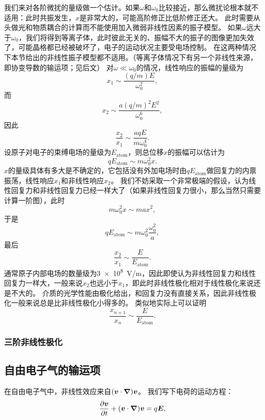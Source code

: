 我们来对各阶微扰的量级做一个估计。如果$\omega$和$\omega_0$比较接近，那么微扰论根本就不适用：此时共振发生，$x$是非常大的，可能高阶修正比低阶修正还大。
此时需要从头做光和物质耦合的计算而不能使用加入微弱非线性因素的振子模型。
如果$\omega$远大于$\omega_0$，我们将得到等离子体，此时彼此无关的、振幅不大的振子的图像更加失效了，可能晶格都已经被破坏了，电子的运动状况主要受电场控制。
在这两种情况下本节给出的非线性振子模型都不适用。（等离子体情况下有另一个非线性来源，即协变导数的输运项；见后文）
对$\omega \ll \omega_0$的情况，线性响应的振幅的量级为
\[
    x_1 \sim \frac{(q/m) E}{\omega_0^2},
\]
而
\[
    x_2 \sim \frac{a (q/m)^2 E^2}{\omega_0^6},
\]
因此
\begin{equation}
    \frac{x_2}{x_1} \sim \frac{a q E}{m \omega_0^4}.
\end{equation}
设原子对电子的束缚电场的量级为$E_\text{atom}$，则总位移$x$的振幅可以估计为
\[
    q E_\text{atom} \sim m \omega_0^2 x .
\]
$x$的量级具体有多大是不确定的，它包括没有外加电场时由$q E_\text{atom}$做回复力的内禀振荡，线性响应$x_1$和非线性响应$x_2$。
我们不妨采取一个非常极端的假设，认为线性回复力和非线性回复力已经一样大了（如果非线性回复力很小，那么当然只需要计算一阶图），此时
\[
    m \omega_0^2 x \sim m a x^2,
\]
于是
\[
    q E_\text{atom} \sim m \omega_0^2 \frac{\omega_0^2}{a},
\]
最后
\begin{equation}
    \frac{x_2}{x_1} \sim \frac{E}{E_\text{atom}}.
\end{equation}
通常原子内部电场的数量级为\SI{3e8}{V/m}，因此即使认为非线性回复力和线性回复力一样大，一般来说$x_2$也远小于$x_1$，即此时非线性极化相对于线性极化来说还是不大的。
介质的光学性能由极化给出，和回复力没有直接关系，因此非线性极化一般来说总是比非线性极化小得多的。
类似地实际上可以证明
\begin{equation}
    \frac{x_{n+1}}{x_n} \sim \frac{E}{E_\text{atom}}.
\end{equation}

\subsubsection{三阶非线性极化}

\subsection{自由电子气的输运项}

在自由电子气中，非线性效应来自$(\vb*{v} \cdot \grad) \vb*{v}$。
我们写下电荷的运动方程：
\begin{equation}
    \pdv{\vb*{v}}{t} + (\vb*{v} \cdot \grad) \vb*{v} = q \vb*{E},
\end{equation}

